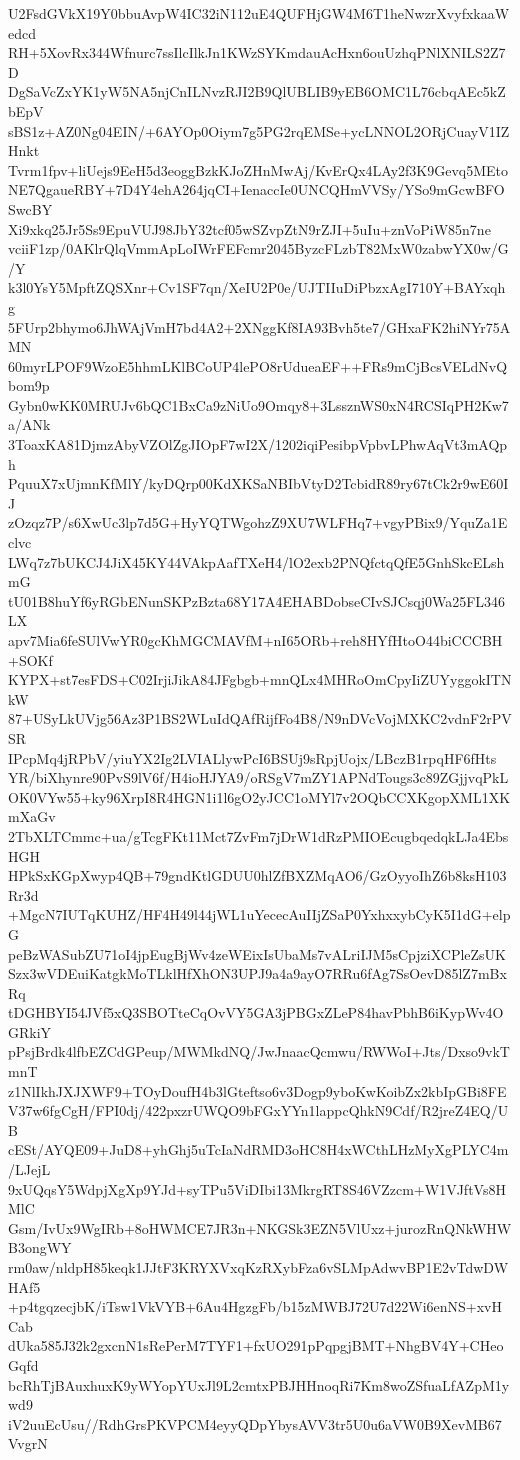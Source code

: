 U2FsdGVkX19Y0bbuAvpW4IC32iN112uE4QUFHjGW4M6T1heNwzrXvyfxkaaWedcd
RH+5XovRx344Wfnurc7ssIlcIlkJn1KWzSYKmdauAcHxn6ouUzhqPNlXNILS2Z7D
DgSaVcZxYK1yW5NA5njCnILNvzRJI2B9QlUBLIB9yEB6OMC1L76cbqAEc5kZbEpV
sBS1z+AZ0Ng04EIN/+6AYOp0Oiym7g5PG2rqEMSe+ycLNNOL2ORjCuayV1IZHnkt
Tvrm1fpv+liUejs9EeH5d3eoggBzkKJoZHnMwAj/KvErQx4LAy2f3K9Gevq5MEto
NE7QgaueRBY+7D4Y4ehA264jqCI+IenaccIe0UNCQHmVVSy/YSo9mGcwBFOSwcBY
Xi9xkq25Jr5Ss9EpuVUJ98JbY32tcf05wSZvpZtN9rZJI+5uIu+znVoPiW85n7ne
vciiF1zp/0AKlrQlqVmmApLoIWrFEFcmr2045ByzcFLzbT82MxW0zabwYX0w/G/Y
k3l0YsY5MpftZQSXnr+Cv1SF7qn/XeIU2P0e/UJTIIuDiPbzxAgI710Y+BAYxqhg
5FUrp2bhymo6JhWAjVmH7bd4A2+2XNggKf8IA93Bvh5te7/GHxaFK2hiNYr75AMN
60myrLPOF9WzoE5hhmLKlBCoUP4lePO8rUdueaEF++FRs9mCjBcsVELdNvQbom9p
Gybn0wKK0MRUJv6bQC1BxCa9zNiUo9Omqy8+3LssznWS0xN4RCSIqPH2Kw7a/ANk
3ToaxKA81DjmzAbyVZOlZgJIOpF7wI2X/1202iqiPesibpVpbvLPhwAqVt3mAQph
PquuX7xUjmnKfMlY/kyDQrp00KdXKSaNBIbVtyD2TcbidR89ry67tCk2r9wE60IJ
zOzqz7P/s6XwUc3lp7d5G+HyYQTWgohzZ9XU7WLFHq7+vgyPBix9/YquZa1Eclvc
LWq7z7bUKCJ4JiX45KY44VAkpAafTXeH4/lO2exb2PNQfctqQfE5GnhSkcELshmG
tU01B8huYf6yRGbENunSKPzBzta68Y17A4EHABDobseCIvSJCsqj0Wa25FL346LX
apv7Mia6feSUlVwYR0gcKhMGCMAVfM+nI65ORb+reh8HYfHtoO44biCCCBH+SOKf
KYPX+st7esFDS+C02IrjiJikA84JFgbgb+mnQLx4MHRoOmCpyIiZUYyggokITNkW
87+USyLkUVjg56Az3P1BS2WLuIdQAfRijfFo4B8/N9nDVcVojMXKC2vdnF2rPVSR
IPcpMq4jRPbV/yiuYX2Ig2LVIALlywPcI6BSUj9sRpjUojx/LBczB1rpqHF6fHts
YR/biXhynre90PvS9lV6f/H4ioHJYA9/oRSgV7mZY1APNdTougs3c89ZGjjvqPkL
OK0VYw55+ky96XrpI8R4HGN1i1l6gO2yJCC1oMYl7v2OQbCCXKgopXML1XKmXaGv
2TbXLTCmmc+ua/gTcgFKt11Mct7ZvFm7jDrW1dRzPMIOEcugbqedqkLJa4EbsHGH
HPkSxKGpXwyp4QB+79gndKtlGDUU0hlZfBXZMqAO6/GzOyyoIhZ6b8ksH103Rr3d
+MgcN7IUTqKUHZ/HF4H49l44jWL1uYececAuIIjZSaP0YxhxxybCyK5I1dG+elpG
peBzWASubZU71oI4jpEugBjWv4zeWEixIsUbaMs7vALriIJM5sCpjziXCPleZsUK
Szx3wVDEuiKatgkMoTLklHfXhON3UPJ9a4a9ayO7RRu6fAg7SsOevD85lZ7mBxRq
tDGHBYI54JVf5xQ3SBOTteCqOvVY5GA3jPBGxZLeP84havPbhB6iKypWv4OGRkiY
pPsjBrdk4lfbEZCdGPeup/MWMkdNQ/JwJnaacQcmwu/RWWoI+Jts/Dxso9vkTmnT
z1NlIkhJXJXWF9+TOyDoufH4b3lGteftso6v3Dogp9yboKwKoibZx2kbIpGBi8FE
V37w6fgCgH/FPI0dj/422pxzrUWQO9bFGxYYn1lappcQhkN9Cdf/R2jreZ4EQ/UB
cESt/AYQE09+JuD8+yhGhj5uTcIaNdRMD3oHC8H4xWCthLHzMyXgPLYC4m/LJejL
9xUQqsY5WdpjXgXp9YJd+syTPu5ViDIbi13MkrgRT8S46VZzcm+W1VJftVs8HMlC
Gsm/IvUx9WgIRb+8oHWMCE7JR3n+NKGSk3EZN5VlUxz+jurozRnQNkWHWB3ongWY
rm0aw/nldpH85keqk1JJtF3KRYXVxqKzRXybFza6vSLMpAdwvBP1E2vTdwDWHAf5
+p4tgqzecjbK/iTsw1VkVYB+6Au4HgzgFb/b15zMWBJ72U7d22Wi6enNS+xvHCab
dUka585J32k2gxcnN1sRePerM7TYF1+fxUO291pPqpgjBMT+NhgBV4Y+CHeoGqfd
bcRhTjBAuxhuxK9yWYopYUxJl9L2cmtxPBJHHnoqRi7Km8woZSfuaLfAZpM1ywd9
iV2uuEcUsu//RdhGrsPKVPCM4eyyQDpYbysAVV3tr5U0u6aVW0B9XevMB67VvgrN
